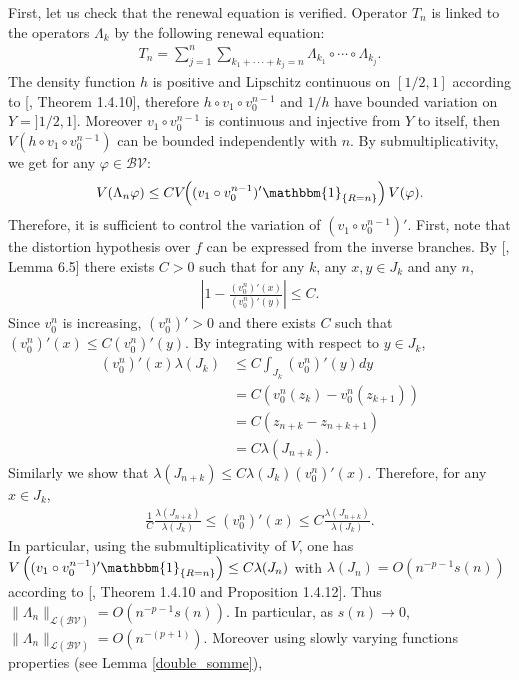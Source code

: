 \documentclass{ws-sd}
\newcommand{\indic}{\mathbbm{1}}
\newcommand{\abs}[1]{\left\lvert #1 \right\rvert}
\newcommand\bigp[1]{\left(#1\right)}
\begin{document}
First, let us check that the renewal equation is verified. Operator $T_n$ is linked to the operators $\Lambda_k$ by the following renewal equation:
\begin{align}\label{eq_renouv}
    T_n = \sum_{j = 1}^{n} \sum_{k_1 +\cdot \cdot \cdot +k_{j}=n}\Lambda_{k_1} \circ \cdots \circ \Lambda_{k_{j}}.
\end{align}
The density function $h$ is positive and Lipschitz continuous on $[1/2,1]$ according to [, Theorem 1.4.10], therefore $h \circ v_1 \circ v_0^{n-1}$ and $1/h$ have bounded variation on $ Y = ]1/2,1]$. Moreover $v_1 \circ v_0^{n-1}$ is continuous and injective from $Y$ to itself, then $V(h \circ v_1 \circ v_0^{n-1})$ can be bounded independently with $n$. By submultiplicativity, we get for any $\varphi \in \mathcal{BV}$:
\begin{align*}
    V(\Lambda_n \varphi) \le C V\hspace{-3pt}\bigp{(v_1 \circ v_0^{n-1})'\indic_{\{R = n \}}} V(\varphi).
\end{align*}
Therefore, it is sufficient to control the variation of $(v_1 \circ v_0^{n-1})'$. First, note that the distortion hypothesis over $f$ can be expressed from the inverse branches. By [, Lemma 6.5] there exists $C > 0$ such that for any $k$, any $x,y \in J_k$ and any $n$,
\begin{align}\label{distortion_v}
    \abs{1-\frac{(v_0^n)'(x)}{(v_0^n)'(y)}} \le C.
\end{align}
Since $v_0^n$ is increasing, $(v_0^n)' > 0$ and there exists $C$ such that
 $(v_0^n)'(x) \le C (v_0^n)'(y)$. By integrating with respect to $y \in J_k$,
\begin{align*}
    {(v_0^n)'(x)} \lambda(J_k)
    &\le C \int_{J_k} (v_0^n)'(y) dy  \\
    &= C (v_0^n(z_k) - v_0^n(z_{k+1}))  \\
    &= C (z_{n+k} - z_{n+k+1})  \\
    &= C \lambda(J_{n+k}).
\end{align*}
Similarly we show that $\lambda(J_{n+k}) \le C\lambda(J_k) (v_0^n)'(x)$. Therefore, for any $x \in J_k$,
\begin{align}\label{encadrement_v_0^n'}
    \frac{1}{C}\frac{\lambda(J_{n+k})}{\lambda(J_k)} \le {(v_0^n)'(x)} \le  C\frac{\lambda(J_{n+k})}{\lambda(J_k)}.
\end{align}
In particular, using the submultiplicativity of $V$, one has $V\bigp{(v_1 \circ v_0^{n-1})'\indic_{\{R = n \}}} \le C\lambda(J_n)$ with $\lambda(J_n) = O(n^{-p-1}s(n))$ according to [, Theorem 1.4.10 and Proposition 1.4.12]. Thus $\lVert \Lambda_n \rVert _{\mathcal L(\mathcal{BV})} = O(n^{-p-1}s(n))$. In particular, as $s(n) \to 0$, $\lVert \Lambda_n \rVert _{\mathcal L(\mathcal{BV})} = O(n^{-(p+1)})$. Moreover using slowly varying functions properties (see Lemma \ref{double_somme}),
\end{document}
